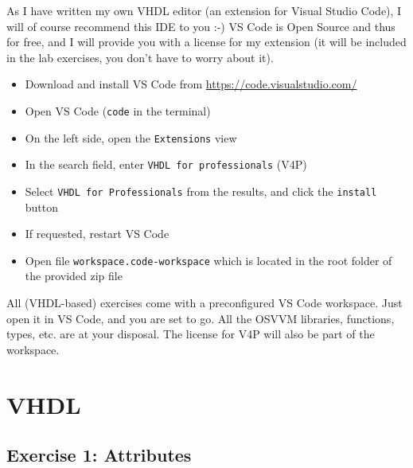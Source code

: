 \documentclass[12pt,epsf,makeidx,oneside]{book}
\begin{document}
  As I have written my own VHDL editor (an extension for Visual Studio Code), I will of course recommend this IDE to you :-) VS Code is Open Source and thus for free,
  and I will provide you with a license for my extension (it will be included in the lab exercises, you don't have to worry about it).

  \begin{itemize}[noitemsep]
    \item Download and install VS Code from \url{https://code.visualstudio.com/}
    \item Open VS Code ({\tt code} in the terminal)
    \item On the left side, open the {\tt Extensions} view
    \item In the search field, enter {\tt VHDL for professionals} (V4P)
    \item Select {\tt VHDL for Professionals} from the results, and click the {\tt install} button
    \item If requested, restart VS Code
    \item Open file {\tt workspace.code-workspace} which is located in the root folder of the provided zip file
  \end{itemize}

  All (VHDL-based) exercises come with a preconfigured VS Code workspace. Just open it in VS Code, and you are set to go. All the OSVVM libraries, functions, types, etc. are at your disposal. The license for V4P will also be part of the workspace.

    
\chapter{VHDL}

\section{Exercise 1: Attributes}
\end{document}
